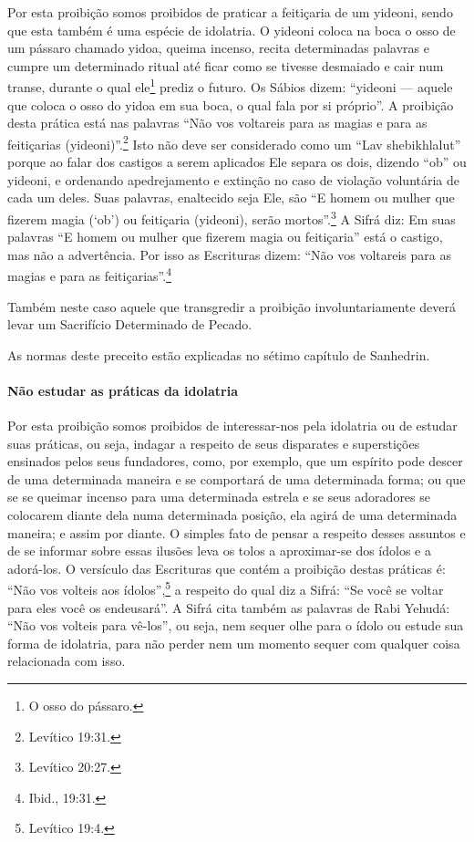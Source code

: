 Por esta proibição somos proibidos de praticar a feitiçaria de um
yideoni, sendo que esta também é uma espécie de idolatria. O
yideoni coloca na boca o osso de um pássaro chamado yidoa,
queima incenso, recita determinadas palavras e cumpre um determinado
ritual até ficar como se tivesse desmaiado e cair num transe, durante o
qual ele\footnote{O osso do pássaro.} prediz o futuro. Os Sábios dizem:
``yideoni --- aquele que coloca o osso do yidoa em sua boca, o qual
fala por si próprio''. A proibição desta prática está nas palavras ``Não
vos voltareis para as magias e para as feitiçarias (yideoni)''.\footnote{Levítico 19:31.} Isto não deve ser considerado como um ``Lav
shebikhlalut'' porque ao falar dos castigos a serem aplicados Ele separa
os dois, dizendo ``ob'' ou yideoni, e ordenando apedrejamento e
extinção no caso de violação voluntária de cada um deles. Suas palavras,
enaltecido seja Ele, são ``E homem ou mulher que fizerem magia (`ob') ou
feitiçaria (yideoni), serão mortos''.\footnote{Levítico 20:27.} A Sifrá diz: Em
suas palavras ``E homem ou mulher que fizerem magia ou feitiçaria'' está
o castigo, mas não a advertência. Por isso as Escrituras dizem: ``Não
vos voltareis para as magias e para as feitiçarias''.\footnote{Ibid., 19:31.}

Também neste caso aquele que transgredir a proibição involuntariamente
deverá levar um Sacrifício Determinado de Pecado.

As normas deste preceito estão explicadas no sétimo capítulo de Sanhedrin.

\paragraph{Não estudar as práticas da idolatria}

Por esta proibição somos proibidos de interessar-nos pela idolatria ou
de estudar suas práticas, ou seja, indagar a respeito de seus disparates
e superstições ensinados pelos seus fundadores, como, por exemplo, que
um espírito pode descer de uma determinada maneira e se comportará de
uma determinada forma; ou que se se queimar incenso para uma determinada
estrela e se seus adoradores se colocarem diante dela numa determinada
posição, ela agirá de uma determinada maneira; e assim por diante. O
simples fato de pensar a respeito desses assuntos e de se informar sobre
essas ilusões leva os tolos a aproximar-se dos ídolos e a adorá-los. O
versículo das Escrituras que contém a proibição destas práticas é:
``Não vos volteis aos ídolos'',\footnote{Levítico 19:4.} a respeito do qual diz a
Sifrá: ``Se você se voltar para eles você os endeusará''. A Sifrá cita
também as palavras de Rabi Yehudá: ``Não vos volteis para vê-los'', ou seja,
nem sequer olhe para o ídolo ou estude sua forma de idolatria, para não
perder nem um momento sequer com qualquer coisa relacionada com isso.

